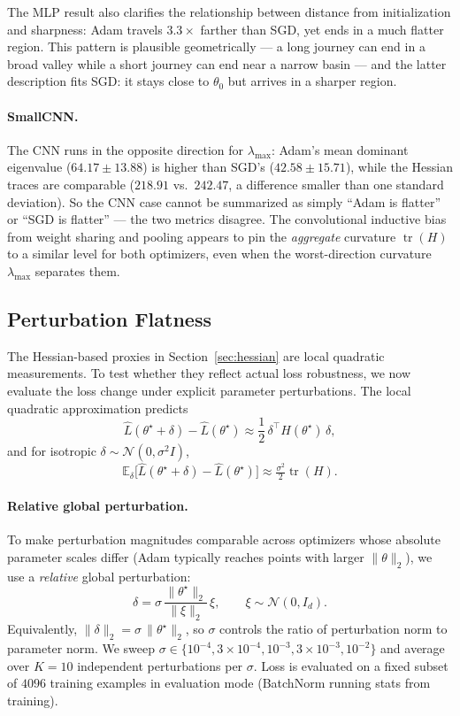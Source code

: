 \documentclass[11pt]{article}
\begin{document}
The MLP result also clarifies the relationship between distance from initialization and sharpness: Adam travels $3.3\times$ farther than SGD, yet ends in a much flatter region. This pattern is plausible geometrically --- a long journey can end in a broad valley while a short journey can end near a narrow basin --- and the latter description fits SGD: it stays close to $\theta_0$ but arrives in a sharper region.

\paragraph{SmallCNN.}
The CNN runs in the opposite direction for $\lambda_{\max}$: Adam's mean dominant eigenvalue ($64.17 \pm 13.88$) is higher than SGD's ($42.58 \pm 15.71$), while the Hessian traces are comparable ($218.91$ vs.\ $242.47$, a difference smaller than one standard deviation). So the CNN case cannot be summarized as simply ``Adam is flatter'' or ``SGD is flatter'' --- the two metrics disagree. The convolutional inductive bias from weight sharing and pooling appears to pin the \emph{aggregate} curvature $\operatorname{tr}(H)$ to a similar level for both optimizers, even when the worst-direction curvature $\lambda_{\max}$ separates them.

\subsection{Perturbation Flatness}
\label{sec:perturbation}

The Hessian-based proxies in Section~\ref{sec:hessian} are local quadratic measurements. To test whether they reflect actual loss robustness, we now evaluate the loss change under explicit parameter perturbations. The local quadratic approximation predicts
\[
\widehat L(\theta^\star+\delta) - \widehat L(\theta^\star)
\approx \frac{1}{2}\,\delta^\top H(\theta^\star)\,\delta,
\]
and for isotropic $\delta\sim\mathcal{N}(0,\sigma^2 I)$,
\[
\mathbb{E}_{\delta}\big[\widehat L(\theta^\star+\delta)-\widehat L(\theta^\star)\big]
\approx \tfrac{\sigma^2}{2}\operatorname{tr}(H).
\]

\paragraph{Relative global perturbation.}
To make perturbation magnitudes comparable across optimizers whose absolute parameter scales differ (Adam typically reaches points with larger $\|\theta\|_2$), we use a \emph{relative} global perturbation:
\[
\delta = \sigma\,\frac{\|\theta^\star\|_2}{\|\xi\|_2}\,\xi,
\qquad \xi\sim\mathcal{N}(0,I_d).
\]
Equivalently, $\|\delta\|_2 = \sigma\,\|\theta^\star\|_2$, so $\sigma$ controls the ratio of perturbation norm to parameter norm. We sweep $\sigma\in\{10^{-4},3\times 10^{-4},10^{-3},3\times 10^{-3},10^{-2}\}$ and average over $K=10$ independent perturbations per $\sigma$. Loss is evaluated on a fixed subset of $4096$ training examples in evaluation mode (BatchNorm running stats from training).
\end{document}
